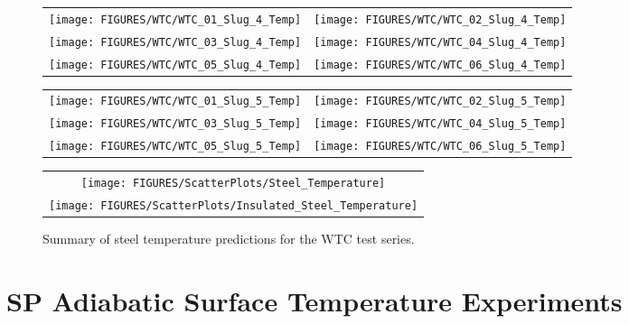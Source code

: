 \begin{figure}[p]
\begin{tabular*}{\textwidth}{l@{\extracolsep{\fill}}r}
\texttt{[image: FIGURES/WTC/WTC\_01\_Slug\_4\_Temp]} &
\texttt{[image: FIGURES/WTC/WTC\_02\_Slug\_4\_Temp]} \\
\texttt{[image: FIGURES/WTC/WTC\_03\_Slug\_4\_Temp]} &
\texttt{[image: FIGURES/WTC/WTC\_04\_Slug\_4\_Temp]} \\
\texttt{[image: FIGURES/WTC/WTC\_05\_Slug\_4\_Temp]} &
\texttt{[image: FIGURES/WTC/WTC\_06\_Slug\_4\_Temp]}
\end{tabular*}
\label{NIST_WTC_Slug_4_Temp}
\end{figure}

\begin{figure}[p]
\begin{tabular*}{\textwidth}{l@{\extracolsep{\fill}}r}
\texttt{[image: FIGURES/WTC/WTC\_01\_Slug\_5\_Temp]} &
\texttt{[image: FIGURES/WTC/WTC\_02\_Slug\_5\_Temp]} \\
\texttt{[image: FIGURES/WTC/WTC\_03\_Slug\_5\_Temp]} &
\texttt{[image: FIGURES/WTC/WTC\_04\_Slug\_5\_Temp]} \\
\texttt{[image: FIGURES/WTC/WTC\_05\_Slug\_5\_Temp]} &
\texttt{[image: FIGURES/WTC/WTC\_06\_Slug\_5\_Temp]}
\end{tabular*}
\label{NIST_WTC_Slug_5_Temp}
\end{figure}


\begin{figure}[p]
\begin{center}
\begin{tabular}{c}
\texttt{[image: FIGURES/ScatterPlots/Steel\_Temperature]} \\
\texttt{[image: FIGURES/ScatterPlots/Insulated\_Steel\_Temperature]}
\end{tabular}
\end{center}
\caption[Summary of steel temperature predictions, WTC test series.]
{Summary of steel temperature predictions for the WTC test series.}
\end{figure}


\clearpage

\section{SP Adiabatic Surface Temperature Experiments}

